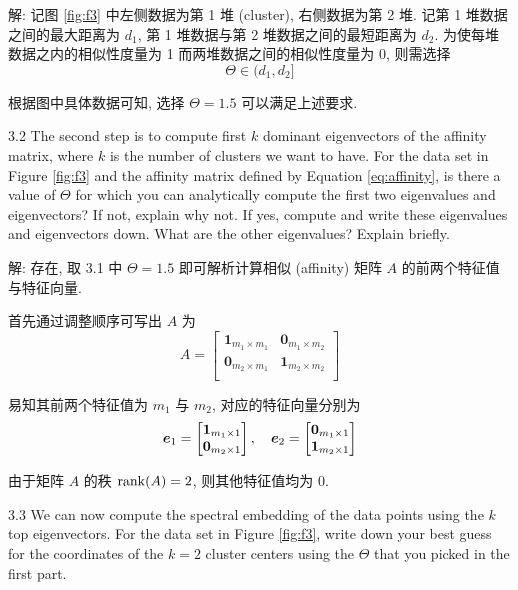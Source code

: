 \documentclass{article}
\begin{document}
解: 记图 \ref{fig:f3} 中左侧数据为第 1 堆 (cluster), 右侧数据为第 2 堆. 记第 1 堆数据之间的最大距离为 $d_1$, 第 1 堆数据与第 2 堆数据之间的最短距离为 $d_2$. 为使每堆数据之内的相似性度量为 1 而两堆数据之间的相似性度量为 0, 则需选择
\begin{equation}
  \Theta\in(d_1,d_2]
\end{equation}

根据图中具体数据可知, 选择 $\Theta=1.5$ 可以满足上述要求.

3.2 The second step is to compute first $k$ dominant eigenvectors of the affinity matrix, where $k$ is the number of clusters we want to have. For the data set in Figure \ref{fig:f3} and the affinity matrix defined by Equation \ref{eq:affinity}, is there a value of $\Theta$ for which you can analytically compute the first two eigenvalues and eigenvectors? If not, explain why not. If yes, compute and write these eigenvalues and eigenvectors down. What are the other eigenvalues? Explain briefly.

解: 存在, 取 3.1 中 $\Theta=1.5$ 即可解析计算相似 (affinity) 矩阵 $A$ 的前两个特征值与特征向量. 

首先通过调整顺序可写出 $A$ 为
\begin{equation}
  A=\begin{bmatrix}
    \bm{1}_{m_1\times m_1} & \bm{0}_{m_1\times m_2} \\
    \bm{0}_{m_2\times m_1} & \bm{1}_{m_2\times m_2} \\
    \end{bmatrix}
\end{equation}

易知其前两个特征值为 $m_1$ 与 $m_2$, 对应的特征向量分别为
\begin{equation}
  \bm{e}_1=\begin{bmatrix}
    \bm{1}_{m_1\times1}\\
    \bm{0}_{m_2\times1}
  \end{bmatrix},\quad
  \bm{e}_2=\begin{bmatrix}
    \bm{0}_{m_1\times1}\\
    \bm{1}_{m_2\times1}
  \end{bmatrix}
\end{equation}

由于矩阵 $A$ 的秩 $\operatorname{rank}(A)=2$, 则其他特征值均为 0.

3.3 We can now compute the spectral embedding of the data points using the $k$ top eigenvectors. For the data set in Figure \ref{fig:f3}, write down your best guess for the coordinates of the $k=2$ cluster centers using the $\Theta$ that you picked in the first part.
\end{document}
